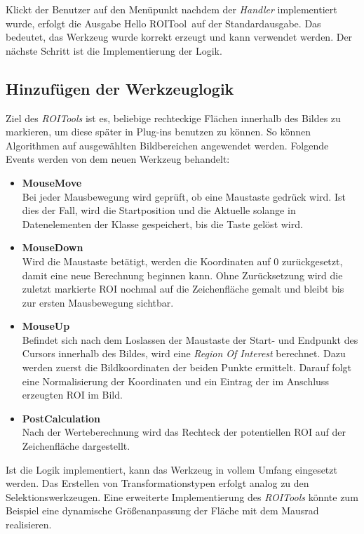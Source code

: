 Klickt der Benutzer auf den Menüpunkt nachdem der \textit{Handler} implementiert wurde, erfolgt die Ausgabe \glqq Hello ROITool\grqq\ auf der Standardausgabe. Das bedeutet, das Werkzeug wurde korrekt erzeugt und kann verwendet werden. Der nächste Schritt ist die Implementierung der Logik.

\subsection{Hinzufügen der Werkzeuglogik}

Ziel des \textit{ROITools} ist es, beliebige rechteckige Flächen innerhalb des Bildes zu markieren, um diese später in Plug-ins benutzen zu können. So können Algorithmen auf ausgewählten Bildbereichen angewendet werden. Folgende Events werden von dem neuen Werkzeug behandelt:

\begin{itemize}
\item \textbf{MouseMove} \\
Bei jeder Mausbewegung wird geprüft, ob eine Maustaste gedrück wird. Ist dies der Fall, wird die Startposition und die Aktuelle solange in Datenelementen der Klasse gespeichert, bis die Taste gelöst wird.
\item \textbf{MouseDown} \\
Wird die Maustaste betätigt, werden die Koordinaten auf $0$ zurückgesetzt, damit eine neue Berechnung beginnen kann. Ohne Zurücksetzung wird die zuletzt markierte ROI nochmal auf die Zeichenfläche gemalt und bleibt bis zur ersten Mausbewegung sichtbar.
\item \textbf{MouseUp} \\
 Befindet sich nach dem Loslassen der Maustaste der Start- und Endpunkt des Cursors innerhalb des Bildes, wird eine \textit{Region Of Interest} berechnet. Dazu werden zuerst die Bildkoordinaten der beiden Punkte ermittelt. Darauf folgt eine Normalisierung der Koordinaten und ein Eintrag der im Anschluss erzeugten ROI im Bild.
\item \textbf{PostCalculation} \\
Nach der Werteberechnung wird das Rechteck der potentiellen ROI auf der Zeichenfläche dargestellt.
\end{itemize}


Ist die Logik implementiert, kann das Werkzeug in vollem Umfang eingesetzt werden. Das Erstellen von Transformationstypen erfolgt analog zu den Selektionswerkzeugen. Eine erweiterte Implementierung des \textit{ROITools} könnte zum Beispiel eine dynamische Größenanpassung der Fläche mit dem Mausrad realisieren.
